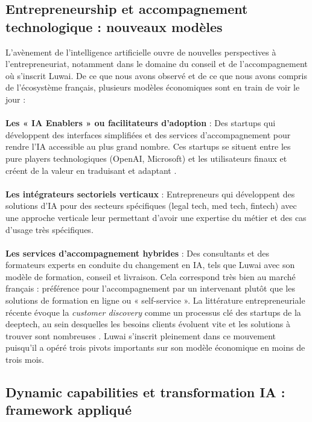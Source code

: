 \subsection{Entrepreneurship et accompagnement technologique : nouveaux modèles}

L’avènement de l’intelligence artificielle ouvre de nouvelles perspectives à l’entrepreneuriat, notamment dans le domaine du conseil et de l’accompagnement où s’inscrit Luwai. De ce que nous avons observé et de ce que nous avons compris de l’écosystème français, plusieurs modèles économiques sont en train de voir le jour :
\\\\
\textbf{Les « IA Enablers » ou facilitateurs d'adoption} : Des startups qui développent des interfaces simplifiées et des services d'accompagnement pour rendre l'IA accessible au plus grand nombre. Ces startups se situent entre les pure players technologiques (OpenAI, Microsoft) et les utilisateurs finaux et créent de la valeur en traduisant et adaptant \cite{parker2016platform}.
\\\\
\textbf{Les intégrateurs sectoriels verticaux} : Entrepreneurs qui développent des solutions d'IA pour des secteurs spécifiques (legal tech, med tech, fintech) avec une approche verticale leur permettant d'avoir une expertise du métier et des cas d'usage très spécifiques.
\\\\
\textbf{Les services d'accompagnement hybrides} : Des consultants et des formateurs experts en conduite du changement en IA, tels que Luwai avec son modèle de formation, conseil et livraison. Cela correspond très bien au marché français : préférence pour l'accompagnement par un intervenant plutôt que les solutions de formation en ligne ou « self-service ».
La littérature entrepreneuriale récente évoque la \textit{customer discovery} comme un processus clé des startups de la deeptech, au sein desquelles les besoins clients évoluent vite et les solutions à trouver sont nombreuses \cite{blank2013startup, osterwalder2014value}. Luwai s’inscrit pleinement dans ce mouvement puisqu’il a opéré trois pivots importants sur son modèle économique en moins de trois mois.

\subsection{Dynamic capabilities et transformation IA : framework appliqué}

